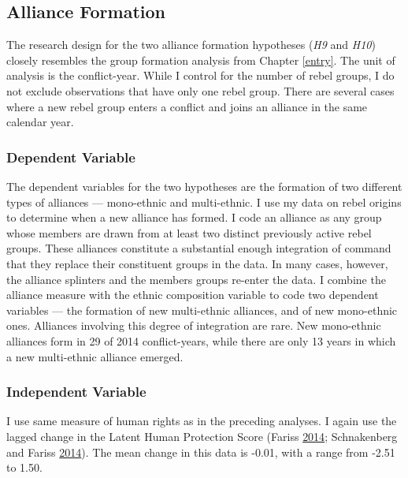 \documentclass[12pt,]{book}
\theoremstyle{definition}
\theoremstyle{definition}
\theoremstyle{remark}
\begin{document}
\subsection{Alliance Formation}\label{alliance-formation}

The research design for the two alliance formation hypotheses (\emph{H9}
and \emph{H10}) closely resembles the group formation analysis from
Chapter \ref{entry}. The unit of analysis is the conflict-year. While I
control for the number of rebel groups, I do not exclude observations
that have only one rebel group. There are several cases where a new
rebel group enters a conflict and joins an alliance in the same calendar
year.

\subsubsection*{Dependent Variable}\label{dependent-variable}

The dependent variables for the two hypotheses are the formation of two
different types of alliances --- mono-ethnic and multi-ethnic. I use my
data on rebel origins to determine when a new alliance has formed. I
code an alliance as any group whose members are drawn from at least two
distinct previously active rebel groups. These alliances constitute a
substantial enough integration of command that they replace their
constituent groups in the data. In many cases, however, the alliance
splinters and the members groups re-enter the data. I combine the
alliance measure with the ethnic composition variable to code two
dependent variables --- the formation of new multi-ethnic alliances, and
of new mono-ethnic ones. Alliances involving this degree of integration
are rare. New mono-ethnic alliances form in 29 of 2014 conflict-years,
while there are only 13 years in which a new multi-ethnic alliance
emerged.

\subsubsection*{Independent Variable}\label{independent-variable}

I use same measure of human rights as in the preceding analyses. I again
use the lagged change in the Latent Human Protection Score (Fariss
\protect\hyperlink{ref-Fariss2014}{2014}; Schnakenberg and Fariss
\protect\hyperlink{ref-Schnakenberg2014}{2014}). The mean change in this
data is -0.01, with a range from -2.51 to 1.50.
\end{document}
